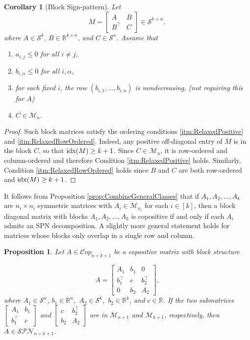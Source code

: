 \documentclass{amsart}
\def\idx{{\rm idx}}
\newcommand{\bbR}{\mathbb{R}}
\newcommand{\cM}{\mathcal{M}}
\newcommand{\cS}{\mathcal{S}}
\newcommand{\Cop}{\mathcal{C}op}
\newcommand{\SPN}{\mathcal{SPN}}
\newtheorem{corollary}[theorem]{Corollary}
\newtheorem{proposition}[theorem]{Proposition}
\theoremstyle{definition}
\begin{document}
\begin{corollary}    
[Block Sign-pattern]\label{ex:BlockSign_SPN}
Let
\begin{equation}\label{eq:BlockStructure1} M=\begin{bmatrix}
A & B\\
B^\top & C
\end{bmatrix}\in \mathcal S^{k+n},
\end{equation}
where $A\in \mathcal{S}^k$, $B\in \mathbb{R}^{k\times n}$, and $C\in \mathcal{S}^n$. Assume that

\begin{enumerate}
\item $a_{i,j}\leq 0$ for all $i\neq j$,
\item $b_{i,\alpha}\leq 0$ for all $i,\alpha$,
\item for each fixed $i$, the row $(b_{i,1},\dots,b_{i,n})$ is nondecreasing, (not requiring this for $A$)
\item $C\in \mathcal M_n$.
\end{enumerate}
\end{corollary}
\begin{proof}
Such block matrices satisfy the ordering conditions \ref{itm:RelaxedPositive} and \ref{itm:RelaxedRowOrdered}. Indeed, any positive off-diagonal entry of $M$ is in the block $C$, so that $\idx(M) \geq k+1$. Since $C\in \cM_n$, it is row-ordered and column-ordered and therefore Condition \ref{itm:RelaxedPositive} holds. Similarly, Condition \ref{itm:RelaxedRowOrdered} holds since $B$ and $C$ are both row-ordered and $\idx(M) \geq k+1$.
\end{proof}

It follows from Proposition \ref{prop:CombineGeneralClasses} that if $A_1, A_2,\ldots, A_k$ are $n_i \times n_i$ symmetric matrices with $A_i \in \cM_{n_i}$ for each $i \in [k]$, then a block diagonal matrix with blocks $A_1,A_2,\ldots, A_k$ is copositive if and only if each $A_i$ admits an SPN decomposition. A slightly more general statement holds for matrices whose blocks only overlap in a single row and column. 

\begin{proposition}\label{prop:almost_block_Mn}
    Let $A \in \Cop_{n+k+1}$ be a copositive matrix with block structure

    \[A = \begin{bmatrix} A_1 & b_1 & 0\\ b_1^\top & c & b_2^\top\\ 0& b_2 & A_2 \end{bmatrix},\]
    where $A_1 \in \cS^n$, $b_1\in \bbR^n,$ $A_2 \in \cS^k,$ $b_2 \in \bbR^k$, and $c \in \bbR$. If the two submatrices $\begin{bmatrix}A_1 & b_1\\ b_1^\top & c \end{bmatrix}$ and $\begin{bmatrix} c & b_2^\top\\ b_2 & A_2\end{bmatrix}$ are in $\cM_{n+1}$ and $\cM_{k+1}$, respectively, then $A \in \SPN_{n+k+1}$.
\end{proposition}
\end{document}

